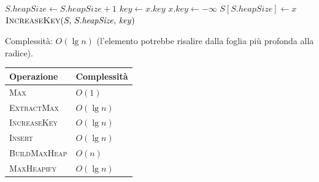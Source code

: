 \begin{algorithm}[H]
	\caption{\textsc{Insert}$(S, x)$}
	$S.\mathit{heapSize} \gets S.\mathit{heapSize} + 1$\;
	$\mathit{key} \gets x.\mathit{key}$\;
	$x.\mathit{key} \gets -\infty$
	$S[S.\mathit{heapSize}] \gets x$\;
	$\textsc{IncreaseKey}(S,\, S.\mathit{heapSize},\, \mathit{key})$
\end{algorithm}

Complessità: $O(\lg n)$ (l'elemento potrebbe risalire dalla foglia
più profonda alla radice).

\begin{center}
	\begin{tabular}{ll}
		\toprule
		\textbf{Operazione} & \textbf{Complessità} \\
		\midrule
		\textsc{Max}           & $O(1)$      \\
		\textsc{ExtractMax}    & $O(\lg n)$  \\
		\textsc{IncreaseKey}   & $O(\lg n)$  \\
		\textsc{Insert}        & $O(\lg n)$  \\
		\textsc{BuildMaxHeap}  & $O(n)$      \\
		\textsc{MaxHeapify}    & $O(\lg n)$  \\
		\bottomrule
	\end{tabular}
\end{center}



